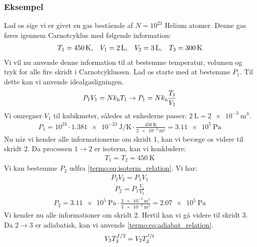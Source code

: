 \documentclass[crop=false, class=memoir]{standalone}
\begin{document}
\subsubsection{Eksempel}

Lad os sige vi er givet en gas bestående af $N=10^{23}$ Helium atomer. Denne gas føres igennem Carnotcyklus med følgende information:
\begin{align}
    T_1 = \SI{450}{\kelvin}, \hspace{3mm} V_1 = \SI{2}{\liter}, \hspace{3mm} V_2 = \SI{3}{\liter}, \hspace{3mm} T_3 = \SI{300}{\kelvin}
\end{align}
Vi vil nu anvende denne information til at bestemme temperatur, volumen og tryk for alle fire skridt i Carnotcyklussen. Lad os starte med at bestemme $P_1$. Til dette kan vi anvende idealgasligningen.
\begin{align}
    P_1 V_1 = Nk_\textsc{b} T_1 \rightarrow P_1 = Nk_\textsc{b}\frac{T_1}{V_1}
\end{align}
Vi omregner $V_1$ til kubikmeter, således at enhederne passer: $\SI{2}{\liter} = \SI{2e-3}{\cubic \meter}$.
\begin{align}
    P_1 = 10^{23}\cdot \SI{1.381e-23}{\joule \per \kelvin} \cdot \frac{\SI{450}{\kelvin}}{\SI{2e-3}{\cubic \meter}} = \SI{3.11e5}{\pascal}
\end{align}
Nu når vi kender alle informationerne om skridt 1, kan vi bevæge os videre til skridt 2. Da processen $1 \rightarrow 2$ er isoterm, kan vi konkludere:
\begin{align}
    T_1 = T_2 = \SI{450}{\kelvin}
\end{align}
Vi kan bestemme $P_2$ udfra \cref{termo:eq:isoterm_relation}. Vi har:
\begin{align}
    P_2 V_2 = P_1 V_1  
\end{align}
\begin{align}
    P_2 = P_1 \frac{V_1}{V_2}
\end{align}
\begin{align}
    P_2 = \SI{3.11e5}{\pascal} \cdot \frac{\SI{2e-3}{\cubic \meter}}{\SI{3e-3}{\cubic \meter}} = \SI{2.07e5}{\pascal}
\end{align}
Vi kender nu alle informationer om skridt 2. Hertil kan vi gå videre til skridt 3. Da $2 \rightarrow 3$ er adiabatisk, kan vi anvende \cref{termo:eq:adiabat_relation}.
\begin{align}
    V_3 T_3^{f/2} = V_2 T_2^{\nicefrac{f}{2}}
\end{align}
\end{document}
